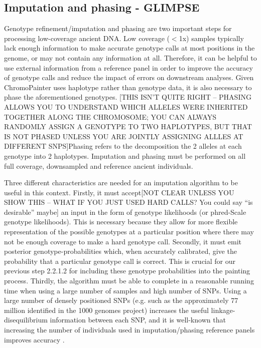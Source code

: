 \subsection{Imputation and phasing - GLIMPSE}

Genotype refinement/imputation and phasing are {\color{red}two} important steps for processing low-coverage ancient DNA. Low coverage ($<$1x) samples typically lack enough information to make accurate genotype calls at most positions in the genome, or may not contain any information at all. Therefore, it {\color{red}can be helpful} to use external information from a reference panel in order to improve the accuracy of genotype calls and reduce the impact of errors on downstream analyses. Given ChromoPainter uses haplotype rather than genotype data, it is also necessary to phase the aforementioned genotypes. {\color{red}[THIS ISN'T QUITE RIGHT -- PHASING ALLOWS YOU TO UNDERSTAND WHICH ALLELES WERE INHERITED TOGETHER ALONG THE CHROMOSOME; YOU CAN ALWAYS RANDOMLY ASSIGN A GENOTYPE TO TWO HAPLOTYPES, BUT THAT IS NOT PHASED UNLESS YOU ARE JOINTLY ASSIGNING ALLLES AT DIFFERENT SNPS]Phasing refers to the decomposition the 2 alleles at each genotype into 2 haplotypes.} Imputation and phasing must be performed on all full coverage, downsampled and reference ancient individuals. 

{\color{red}Three} different characteristics are needed for an imputation algorithm to be useful in this context. Firstly, it {\color{red}must accept[NOT CLEAR UNLESS YOU SHOW THIS -- WHAT IF YOU JUST USED HARD CALLS? You could say ``is desirable'' maybe]} an input in the form of genotype likelihoods (or phred-Scale genotype likelihoods). This is necessary because they allow for more flexible representation of the possible genotypes at a particular position where there may not be enough coverage to make a hard genotype call. Secondly, it must emit posterior genotype-probabilities which, when accurately calibrated, give the probability that a particular genotype call is correct. This is crucial for our previous step 2.2.1.2 for including these genotype probabilities into the painting process. Thirdly, the algorithm must be able to complete in a reasonable running time when using a large number of samples and high number of SNPs. Using a large number of densely positioned SNPs (e.g. such as the approximately 77 million identified in the 1000 genomes project) increases the useful linkage-disequilibrium information between each SNP{\color{red},} and it is well-known that increasing the number of individuals used in imputation/phasing reference panels improves accuracy \cite{delaneau2018integrative, HUANG2009235, mccarthy2016reference, rubinacci2021efficient}. 

